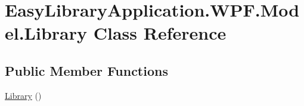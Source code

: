 \hypertarget{class_easy_library_application_1_1_w_p_f_1_1_model_1_1_library}{}\section{Easy\+Library\+Application.\+W\+P\+F.\+Model.\+Library Class Reference}
\label{class_easy_library_application_1_1_w_p_f_1_1_model_1_1_library}
\subsection*{Public Member Functions}
\begin{DoxyCompactItemize}
\item 
\mbox{\hyperlink{class_easy_library_application_1_1_w_p_f_1_1_model_1_1_library_a3eb8865f82500e235af26d6831988adf}{Library}} ()
\end{DoxyCompactItemize}
